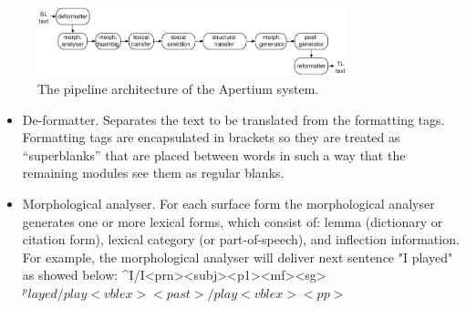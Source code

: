 \documentclass[11pt]{article}
\begin{document}
\begin{figure}[htbp]
\begin{center}
 \includegraphics[width=0.8\textwidth]{architecture.pdf}
\end{center}
\caption{The pipeline architecture of the Apertium system.}
\label{fig:modules}
\end{figure}

\begin{itemize}
\item 	De-formatter. Separates the text to be translated from the formatting tags.  Formatting tags are encapsulated in brackets so they are treated as “superblanks” that are placed between words in such a way that the remaining modules see them as regular blanks.  
\item	Morphological analyser. For each surface form the morphological analyser generates one or more lexical forms, which consist of: lemma (dictionary or citation form), lexical category (or part-of-speech), and inflection information. 
For example, the morphological analyser will deliver next sentence "I played" as showed below:
^I/I<prn><subj><p1><mf><sg>$ 
^played/play<vblex><past>/play<vblex><pp>$


\end{itemize}
\end{document}

